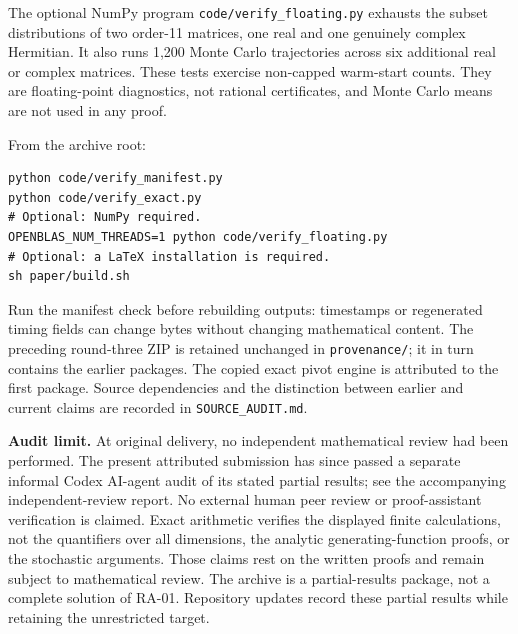 \documentclass[11pt]{article}
\theoremstyle{remark}\newtheorem{remark}[theorem]{Remark}
\begin{document}
The optional NumPy program \texttt{code/verify\_floating.py} exhausts the subset distributions of two order-11 matrices, one real and one genuinely complex Hermitian. It also runs 1,200 Monte Carlo trajectories across six additional real or complex matrices. These tests exercise non-capped warm-start counts. They are floating-point diagnostics, not rational certificates, and Monte Carlo means are not used in any proof.

From the archive root:
\begin{verbatim}
python code/verify_manifest.py
python code/verify_exact.py
# Optional: NumPy required.
OPENBLAS_NUM_THREADS=1 python code/verify_floating.py
# Optional: a LaTeX installation is required.
sh paper/build.sh
\end{verbatim}

Run the manifest check before rebuilding outputs: timestamps or regenerated timing fields can change bytes without changing mathematical content. The preceding round-three ZIP is retained unchanged in \texttt{provenance/}; it in turn contains the earlier packages. The copied exact pivot engine is attributed to the first package. Source dependencies and the distinction between earlier and current claims are recorded in \texttt{SOURCE\_AUDIT.md}.

\textbf{Audit limit.} At original delivery, no independent mathematical review had been performed. The present attributed submission has since passed a separate informal Codex AI-agent audit of its stated partial results; see the accompanying independent-review report. No external human peer review or proof-assistant verification is claimed. Exact arithmetic verifies the displayed finite calculations, not the quantifiers over all dimensions, the analytic generating-function proofs, or the stochastic arguments. Those claims rest on the written proofs and remain subject to mathematical review. The archive is a partial-results package, not a complete solution of RA-01. Repository updates record these partial results while retaining the unrestricted target.
\end{document}

